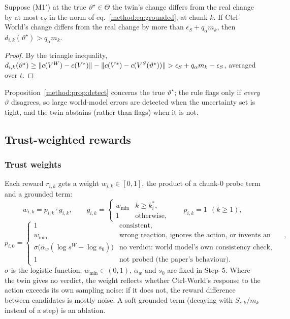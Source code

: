 \begin{proposition}\label{method:prop:detect}
Suppose (M1$'$) at the true $\vartheta^\star\in\Theta$ the twin's change differs from the real change by at most $\epsilon_S$ in the norm of eq.~\eqref{method:eq:grounded}, at chunk $k$. If Ctrl-World's change differs from the real change by more than $\epsilon_S+q_\alpha m_k$, then $d_{i,k}(\vartheta^\star)>q_\alpha m_k$.
\end{proposition}
\begin{proof}
By the triangle inequality, $d_{i,k}(\vartheta^\star)\ge\lVert c(V^{W})-c(V^\ast)\rVert-\lVert c(V^\ast)-c(V^{S}(\vartheta^\star))\rVert>\epsilon_S+q_\alpha m_k-\epsilon_S$, averaged over $t$.
\end{proof}
Proposition~\ref{method:prop:detect} concerns the true $\vartheta^\star$; the rule flags only if \emph{every} $\vartheta$ disagrees, so large world-model errors are detected when the uncertainty set is tight, and the twin abstains (rather than flags) when it is not.

\subsection{Trust-weighted rewards}\label{method:sec:trust}
\subsubsection{Trust weights}
Each reward $r_{i,k}$ gets a weight $w_{i,k}\in[0,1]$, the product of a chunk-0 probe term and a grounded term:
\begin{equation}
w_{i,k}=p_{i,k}\cdot g_{i,k},\qquad
g_{i,k}=\begin{cases}w_{\min}&k\ge k^\ast_i,\\ 1&\text{otherwise},\end{cases}\qquad
p_{i,k}=1\ \ (k\ge1),
\end{equation}
\begin{equation}
p_{i,0}=\begin{cases}
1 & \text{consistent},\\
w_{\min} & \text{wrong reaction, ignores the action, or invents an effect},\\
\sigma\big(\alpha_w(\log s^W-\log s_0)\big) & \text{no verdict: world model's own consistency check},\\
1 & \text{not probed (the paper's behaviour)}.
\end{cases}
\end{equation}
$\sigma$ is the logistic function; $w_{\min}\in(0,1)$, $\alpha_w$ and $s_0$ are fixed in Step~5. Where the twin gives no verdict, the weight reflects whether Ctrl-World's response to the action exceeds its own sampling noise: if it does not, the reward difference between candidates is mostly noise. A soft grounded term (decaying with $S_{i,k}/m_k$ instead of a step) is an ablation.

